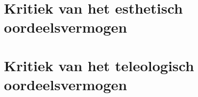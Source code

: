 \documentclass[11pt, showtrims]{memoir}
\begin{document}
\raggedbottom %
\normalfont

\frontmatter
\tableofcontents

\mainmatter

\part{Kritiek van het esthetisch oordeelsvermogen}





\part{Kritiek van het teleologisch oordeelsvermogen}

\backmatter
\end{document}
